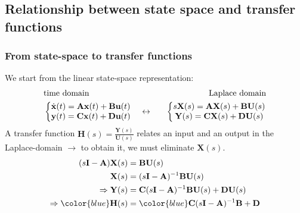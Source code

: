 \subsection{Relationship between state space and transfer functions}

\begin{frame}
\frametitle{From state-space to transfer functions}
We start from the linear state-space representation:
\begin{align*}
&\text{time domain}\hfill &\text{Laplace domain} \\
&\left\{ \begin{matrix}
\dot{\mathbf{x}}(t) = \mathbf{A} \mathbf{x}(t) + \mathbf{B} \mathbf{u}(t) \\
\mathbf{y}(t) = \mathbf{C} \mathbf{x}(t) + \mathbf{D} \mathbf{u}(t)
\end{matrix} \right. \quad\leftrightarrow\quad
&\left\{ \begin{matrix}
s \mathbf{X}(s) = \mathbf{A} \mathbf{X}(s) + \mathbf{B} \mathbf{U}(s) \\
\mathbf{Y}(s) = \mathbf{C} \mathbf{X}(s) + \mathbf{D} \mathbf{U}(s)
\end{matrix} \right.
\end{align*}
\pause
A transfer function $\mathbf{H}(s) = \frac{\mathbf{Y}(s)}{\mathbf{U}(s)}$ relates an input and an output in the Laplace-domain $\rightarrow$ to obtain it, we must eliminate $\mathbf{X}(s)$.
\pause
\begin{align*}
(s\mathbf{I}-\mathbf{A}) \mathbf{X}(s) &= \mathbf{B} \mathbf{U}(s) \\
\mathbf{X}(s) &= (s\mathbf{I}-\mathbf{A})^{-1} \mathbf{B} \mathbf{U}(s) \\
\Rightarrow \mathbf{Y}(s) &= \mathbf{C} (s\mathbf{I}-\mathbf{A})^{-1} \mathbf{B} \mathbf{U}(s) + \mathbf{D} \mathbf{U}(s) \\
\Rightarrow \hfill {\color{blue}\mathbf{H}(s)} &= {\color{blue}\mathbf{C} (s\mathbf{I}-\mathbf{A})^{-1} \mathbf{B} + \mathbf{D}}
\end{align*}
\end{frame}

